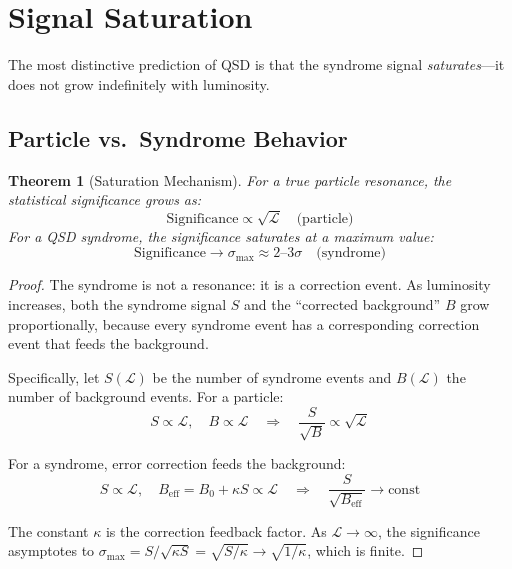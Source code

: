 \documentclass[11pt,a4paper]{article}
\newtheorem{theorem}{Theorem}[section]
\theoremstyle{definition}
\theoremstyle{remark}
\begin{document}
\section{Signal Saturation}
\label{sec:saturation}

The most distinctive prediction of QSD is that the syndrome signal \emph{saturates}---it does not grow indefinitely with luminosity.

\subsection{Particle vs.\ Syndrome Behavior}

\begin{theorem}[Saturation Mechanism]
\label{thm:saturation}
For a true particle resonance, the statistical significance grows as:
\begin{equation}
\text{Significance} \propto \sqrt{\mathcal{L}} \quad \text{(particle)}
\end{equation}
For a QSD syndrome, the significance saturates at a maximum value:
\begin{equation}
\text{Significance} \to \sigma_{\max} \approx 2\text{--}3\sigma \quad \text{(syndrome)}
\end{equation}
\end{theorem}

\begin{proof}
The syndrome is not a resonance: it is a correction event. As luminosity increases, both the syndrome signal $S$ and the ``corrected background'' $B$ grow proportionally, because every syndrome event has a corresponding correction event that feeds the background.

Specifically, let $S(\mathcal{L})$ be the number of syndrome events and $B(\mathcal{L})$ the number of background events. For a particle:
\begin{equation}
S \propto \mathcal{L}, \quad B \propto \mathcal{L} \quad \Rightarrow \quad \frac{S}{\sqrt{B}} \propto \sqrt{\mathcal{L}}
\end{equation}

For a syndrome, error correction feeds the background:
\begin{equation}
S \propto \mathcal{L}, \quad B_{\mathrm{eff}} = B_0 + \kappa S \propto \mathcal{L} \quad \Rightarrow \quad \frac{S}{\sqrt{B_{\mathrm{eff}}}} \to \text{const}
\end{equation}

The constant $\kappa$ is the correction feedback factor. As $\mathcal{L} \to \infty$, the significance asymptotes to $\sigma_{\max} = S/\sqrt{\kappa S} = \sqrt{S/\kappa} \to \sqrt{1/\kappa}$, which is finite.
\end{proof}
\end{document}
